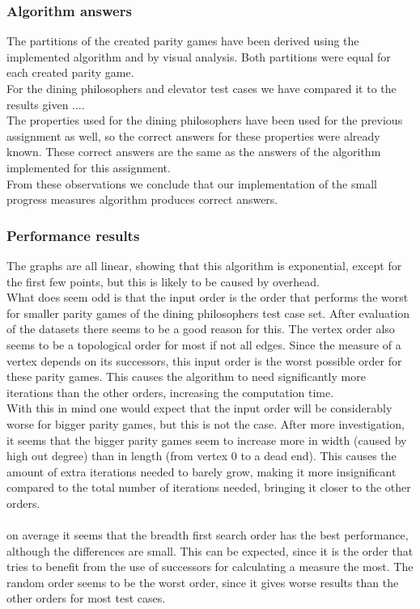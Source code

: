 \documentclass[10pt,a4paper]{article}
\begin{document}
\subsubsection{Algorithm answers}
The partitions of the created parity games have been derived using the implemented algorithm and by visual analysis. Both partitions were equal for each created parity game.\\
For the dining philosophers and elevator test cases we have compared it to the results given ....\\
The properties used for the dining philosophers have been used for the previous assignment as well, so the correct answers for these properties were already known. These correct answers are the same as the answers of the algorithm implemented for this assignment.\\
From these observations we conclude that our implementation of the small progress measures algorithm produces correct answers.

\subsubsection{Performance results}
The graphs are all linear, showing that this algorithm is exponential, except for the first few points, but this is likely to be caused by overhead.\\
What does seem odd is that the input order is the order that performs the worst for smaller parity games of the dining philosophers test case set. After evaluation of the datasets there seems to be a good reason for this. The vertex order also seems to be a topological order for most if not all edges. Since the measure of a vertex depends on its successors, this input order is the worst possible order for these parity games. This causes the algorithm to need significantly more iterations than the other orders, increasing the computation time.\\
With this in mind one would expect that the input order will be considerably worse for bigger parity games, but this is not the case. After more investigation, it seems that the bigger parity games seem to increase more in width (caused by high out degree) than in length (from vertex 0 to a dead end). This causes the amount of extra iterations needed to barely grow, making it more insignificant compared to the total number of iterations needed, bringing it closer to the other orders.
\\\\
on average it seems that the breadth first search order has the best performance, although the differences are small. This can be expected, since it is the order that tries to benefit from the use of successors for calculating a measure the most. The random order seems to be the worst order, since it gives worse results than the other orders for most test cases.
\end{document}
